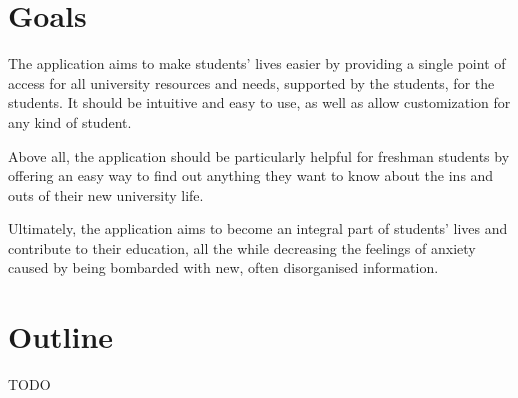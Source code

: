 \section{Goals} \label{1:goals}

    The application aims to make students' lives easier by providing a single point of access for all university resources and needs, supported by the students, for the students. It should be intuitive and easy to use, as well as allow customization for any kind of student.
    
    Above all, the application should be particularly helpful for freshman students by offering an easy way to find out anything they want to know about the ins and outs of their new university life.
    
    Ultimately, the application aims to become an integral part of students' lives and contribute to their education, all the while decreasing the feelings of anxiety caused by being bombarded with new, often disorganised information.

\section{Outline} \label{1:outline}
    TODO